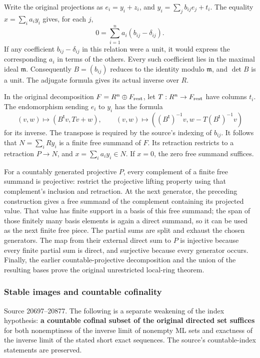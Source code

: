 Write the original projections as \(e_i=y_i+z_i\), and \(y_i=\sum_j b_{ij}e_j+t_i\). The equality \(x=\sum_i a_i y_i\) gives, for each \(j\), \[
0=\sum_{i=1}^n a_i(b_{ij}-\delta_{ij}).
\] If any coefficient \(b_{ij}-\delta_{ij}\) in this relation were a unit, it would express the corresponding \(a_i\) in terms of the others. Every such coefficient lies in the maximal ideal \(\mathfrak m\). Consequently \(B=(b_{ij})\) reduces to the identity modulo \(\mathfrak m\), and \(\det B\) is a unit. The adjugate formula gives its actual inverse over \(R\).

In the original decomposition \(F=R^n\oplus F_{\rm rest}\), let \(T:R^n\to F_{\rm rest}\) have columns \(t_i\). The endomorphism sending \(e_i\) to \(y_i\) has the formula \[
(v,w)\longmapsto(B^{\mathsf t}v,Tv+w),
\qquad
(v,w)\longmapsto((B^{\mathsf t})^{-1}v,w-T(B^{\mathsf t})^{-1}v)
\] for its inverse. The transpose is required by the source's indexing of \(b_{ij}\). It follows that \(N=\sum_i Ry_i\) is a finite free summand of \(F\). Its retraction restricts to a retraction \(P\to N\), and \(x=\sum_i a_i y_i\in N\). If \(x=0\), the zero free summand suffices.

For a countably generated projective \(P\), every complement of a finite free summand is projective: restrict the projective lifting property using that complement's inclusion and retraction. At the next generator, the preceding construction gives a free summand of the complement containing its projected value. That value has finite support in a basis of this free summand; the span of those finitely many basis elements is again a direct summand, so it can be used as the next finite free piece. The partial sums are split and exhaust the chosen generators. The map from their external direct sum to \(P\) is injective because every finite partial sum is direct, and surjective because every generator occurs. Finally, the earlier countable-projective decomposition and the union of the resulting bases prove the original unrestricted local-ring theorem.

\subsubsection{Stable images and countable cofinality}\label{algebra-proof-012-stable-images-and-countable-cofinality}

Source 20697--20877. The following is a separate weakening of the index hypothesis: \textbf{a countable cofinal subset of the original directed set suffices} for both nonemptiness of the inverse limit of nonempty ML sets and exactness of the inverse limit of the stated short exact sequences. The source's countable-index statements are preserved.

